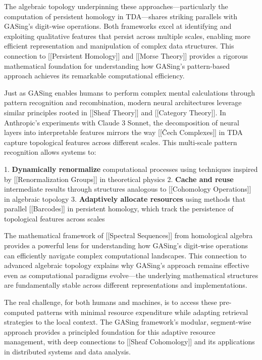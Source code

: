 The algebraic topology underpinning these approaches—particularly the computation of persistent homology in TDA—shares striking parallels with GASing's digit-wise operations. Both frameworks excel at identifying and exploiting qualitative features that persist across multiple scales, enabling more efficient representation and manipulation of complex data structures. This connection to [[Persistent Homology]] and [[Morse Theory]] provides a rigorous mathematical foundation for understanding how GASing's pattern-based approach achieves its remarkable computational efficiency.

Just as GASing enables humans to perform complex mental calculations through pattern recognition and recombination, modern neural architectures leverage similar principles rooted in [[Sheaf Theory]] and [[Category Theory]]. In Anthropic's experiments with Claude 3 Sonnet, the decomposition of neural layers into interpretable features mirrors the way [[Čech Complexes]] in TDA capture topological features across different scales. This multi-scale pattern recognition allows systems to:

1. \textbf{Dynamically renormalize} computational processes using techniques inspired by [[Renormalization Groups]] in theoretical physics
2. \textbf{Cache and reuse} intermediate results through structures analogous to [[Cohomology Operations]] in algebraic topology
3. \textbf{Adaptively allocate resources} using methods that parallel [[Barcodes]] in persistent homology, which track the persistence of topological features across scales

The mathematical framework of [[Spectral Sequences]] from homological algebra provides a powerful lens for understanding how GASing's digit-wise operations can efficiently navigate complex computational landscapes. This connection to advanced algebraic topology explains why GASing's approach remains effective even as computational paradigms evolve—the underlying mathematical structures are fundamentally stable across different representations and implementations.

The real challenge, for both humans and machines, is to access these pre-computed patterns with minimal resource expenditure while adapting retrieval strategies to the local context. The GASing framework's modular, segment-wise approach provides a principled foundation for this adaptive resource management, with deep connections to [[Sheaf Cohomology]] and its applications in distributed systems and data analysis.

